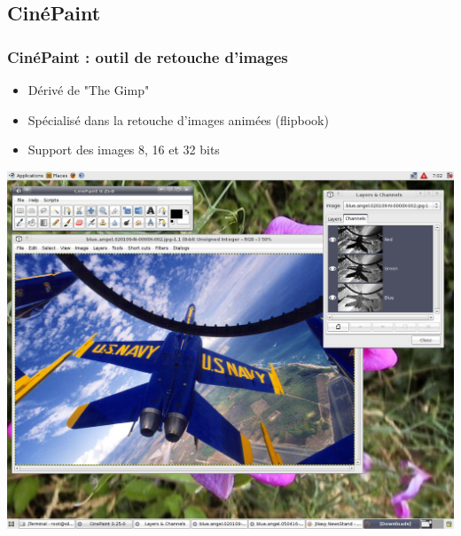 \subsection{CinéPaint}
\begin{frame}
\frametitle{CinéPaint : outil de retouche d'images}
\begin{itemize}
\item Dérivé de "The Gimp"
\item Spécialisé dans la retouche d'images animées (flipbook)
\item Support des images 8, 16 et 32 bits
\end{itemize}

\includegraphics[scale=0.15]{ressources/cinepaint.png}
\end{frame}

